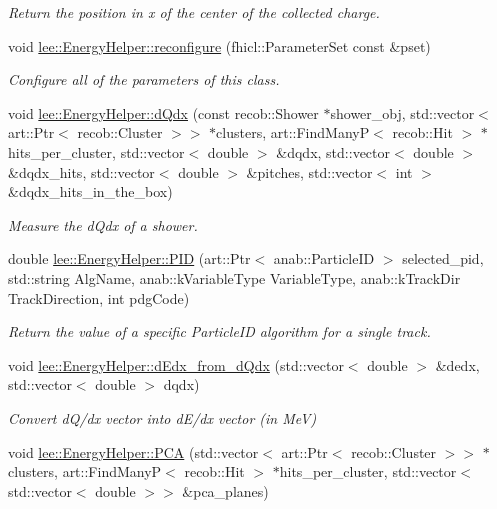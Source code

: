 \begin{DoxyCompactItemize}
\begin{DoxyCompactList}\small\item\em Return the position in x of the center of the collected charge. \end{DoxyCompactList}\item 
void \hyperlink{group__lee_ga4523185d78d6b7aa94dbf26475750282}{lee\-::\-Energy\-Helper\-::reconfigure} (fhicl\-::\-Parameter\-Set const \&pset)
\begin{DoxyCompactList}\small\item\em Configure all of the parameters of this class. \end{DoxyCompactList}\item 
void \hyperlink{group__lee_ga2da6cbede1c42495e837b3a8b733be48}{lee\-::\-Energy\-Helper\-::d\-Qdx} (const recob\-::\-Shower $\ast$shower\-\_\-obj, std\-::vector$<$ art\-::\-Ptr$<$ recob\-::\-Cluster $>$$>$ $\ast$clusters, art\-::\-Find\-Many\-P$<$ recob\-::\-Hit $>$ $\ast$hits\-\_\-per\-\_\-cluster, std\-::vector$<$ double $>$ \&dqdx, std\-::vector$<$ double $>$ \&dqdx\-\_\-hits, std\-::vector$<$ double $>$ \&pitches, std\-::vector$<$ int $>$ \&dqdx\-\_\-hits\-\_\-in\-\_\-the\-\_\-box)
\begin{DoxyCompactList}\small\item\em Measure the d\-Qdx of a shower. \end{DoxyCompactList}\item 
double \hyperlink{group__lee_gab3e573f8d2d733f94b8ca862d7343864}{lee\-::\-Energy\-Helper\-::\-P\-I\-D} (art\-::\-Ptr$<$ anab\-::\-Particle\-I\-D $>$ selected\-\_\-pid, std\-::string Alg\-Name, anab\-::k\-Variable\-Type Variable\-Type, anab\-::k\-Track\-Dir Track\-Direction, int pdg\-Code)
\begin{DoxyCompactList}\small\item\em Return the value of a specific Particle\-I\-D algorithm for a single track. \end{DoxyCompactList}\item 
void \hyperlink{group__lee_ga2844c7f27f79fbe5e16d9c674ca4afa1}{lee\-::\-Energy\-Helper\-::d\-Edx\-\_\-from\-\_\-d\-Qdx} (std\-::vector$<$ double $>$ \&dedx, std\-::vector$<$ double $>$ dqdx)
\begin{DoxyCompactList}\small\item\em Convert d\-Q/dx vector into d\-E/dx vector (in Me\-V) \end{DoxyCompactList}\item 
void \hyperlink{group__lee_gac5f41d2b1bee9a0f761179f3059f8a49}{lee\-::\-Energy\-Helper\-::\-P\-C\-A} (std\-::vector$<$ art\-::\-Ptr$<$ recob\-::\-Cluster $>$$>$ $\ast$clusters, art\-::\-Find\-Many\-P$<$ recob\-::\-Hit $>$ $\ast$hits\-\_\-per\-\_\-cluster, std\-::vector$<$ std\-::vector$<$ double $>$$>$ \&pca\-\_\-planes)
$$
\end{DoxyCompactItemize}
